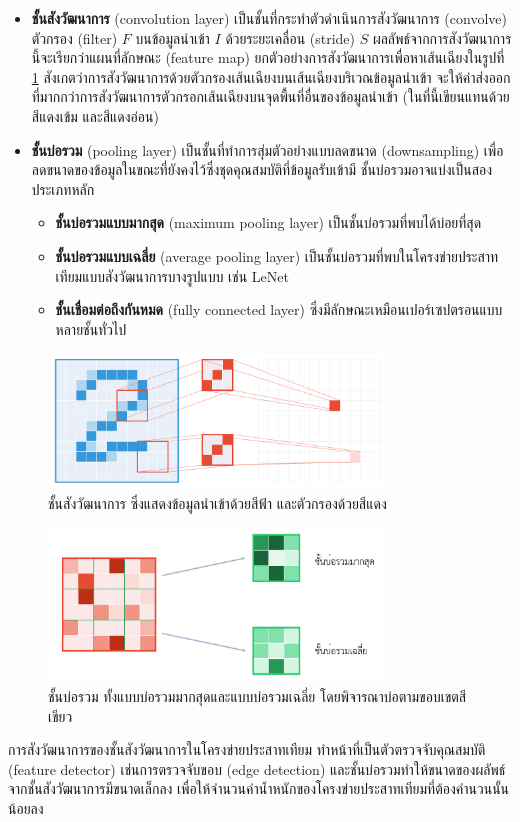 \documentclass{cpereport}
\begin{document}
\begin{itemize}
    \item \textbf{ชั้นสังวัฒนาการ} (convolution layer) เป็นชั้นที่กระทำตัวดำเนินการสังวัฒนาการ (convolve) ตัวกรอง (filter) $F$ บนข้อมูลนำเข้า $I$ ด้วยระยะเคลื่อน (stride) $S$ ผลลัพธ์จากการสังวัฒนาการนี้จะเรียกว่าแผนที่ลักษณะ (feature map) ยกตัวอย่างการสังวัฒนาการเพื่อหาเส้นเฉียงในรูปที่ \ref{conv-figure} สังเกตว่าการสังวัฒนาการด้วยตัวกรองเส้นเฉียงบนเส้นเฉียงบริเวณข้อมูลนำเข้า จะให้ค่าส่งออกที่มากกว่าการสังวัฒนาการตัวกรอกเส้นเฉียงบนจุดพื้นที่อื่นของข้อมูลนำเข้า (ในที่นี้เขียนแทนด้วยสีแดงเข้ม และสีแดงอ่อน)
    \item \textbf{ชั้นบ่อรวม} (pooling layer)
    เป็นชั้นที่ทำการสุ่มตัวอย่างแบบลดขนาด (downsampling) เพื่อลดขนาดของข้อมูลในขณะที่ยังคงไว้ซึ่งชุดคุณสมบัติที่ข้อมูลรับเข้ามี ชั้นบ่อรวมอาจแบ่งเป็นสองประเภทหลัก
    \begin{itemize} 
        \item \textbf{ชั้นบ่อรวมแบบมากสุด} (maximum pooling layer) เป็นชั้นบ่อรวมที่พบได้บ่อยที่สุด
        \item \textbf{ชั้นบ่อรวมแบบเฉลี่ย} (average pooling layer) เป็นชั้นบ่อรวมที่พบในโครงข่ายประสาทเทียมแบบสังวัฒนาการบางรูปแบบ เช่น LeNet
        \item \textbf{ชั้นเชื่อมต่อถึงกันหมด} (fully connected layer) ซึ่งมีลักษณะเหมือนเปอร์เซปตรอนแบบหลายชั้นทั่วไป
    \end{itemize}
\end{itemize}

\begin{figure}
    \centering
    \includegraphics[width=0.8\textwidth]{images/convolution.pdf}
    \caption{ชั้นสังวัฒนาการ ซึ่งแสดงข้อมูลนำเข้าด้วยสีฟ้า และตัวกรองด้วยสีแดง}
    \label{conv-figure}
\end{figure}
\begin{figure}
    \centering
    \includegraphics[width=0.8\textwidth]{images/pool.pdf}
    \caption{ชั้นบ่อรวม ทั้งแบบบ่อรวมมากสุดและแบบบ่อรวมเฉลี่ย โดยพิจารณาบ่อตามขอบเขตสีเขียว}
    \label{pool-figure}
\end{figure}
การสังวัฒนาการของชั้นสังวัฒนาการในโครงข่ายประสาทเทียม ทำหน้าที่เป็นตัวตรวจจับคุณสมบัติ (feature detector) เช่นการตรวจจับขอบ (edge detection) และชั้นบ่อรวมทำให้ขนาดของผลัพธ์จากชั้นสังวัฒนาการมีขนาดเล็กลง เพื่อให้จำนวนค่าน้ำหนักของโครงข่ายประสาทเทียมที่ต้องคำนวนนั้นน้อยลง
\end{document}
